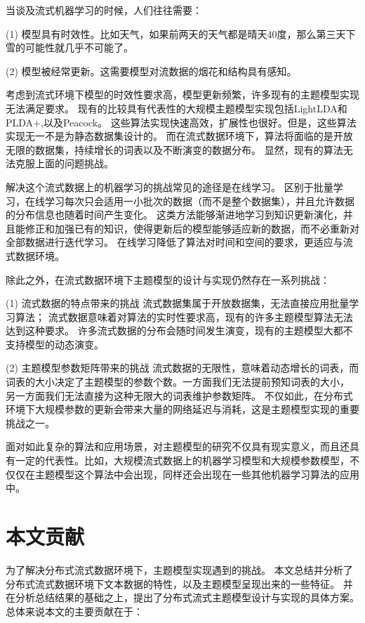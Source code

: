 当谈及流式机器学习的时候，人们往往需要：

(1) 模型具有时效性。比如天气，如果前两天的天气都是晴天40度，那么第三天下雪的可能性就几乎不可能了。

(2) 模型被经常更新。这需要模型对流数据的烟花和结构具有感知。

考虑到流式环境下模型的时效性要求高，模型更新频繁，许多现有的主题模型实现无法满足要求。
现有的比较具有代表性的大规模主题模型实现包括LightLDA\cite{yuan2015lightlda}和PLDA+\cite{Liu:2011:PPL:1961189.1961198},以及Peacock\cite{Peacock}。
这些算法实现快速高效，扩展性也很好。但是，这些算法实现无一不是为静态数据集设计的。
而在流式数据环境下，算法将面临的是开放无限的数据集，持续增长的词表以及不断演变的数据分布。
显然，现有的算法无法克服上面的问题挑战。

解决这个流式数据上的机器学习的挑战常见的途径是在线学习。
区别于批量学习，在线学习每次只会适用一小批次的数据（而不是整个数据集），并且允许数据的分布信息也随着时间产生变化。
这类方法能够渐进地学习到知识更新演化，并且能修正和加强已有的知识，使得更新后的模型能够适应新的数据，而不必重新对全部数据进行迭代学习。
在线学习降低了算法对时间和空间的要求，更适应与流式数据环境。

除此之外，在流式数据环境下主题模型的设计与实现仍然存在一系列挑战：

(1) 流式数据的特点带来的挑战
流式数据集属于开放数据集，无法直接应用批量学习算法；
流式数据意味着对算法的实时性要求高，现有的许多主题模型算法无法达到这种要求。
许多流式数据的分布会随时间发生演变，现有的主题模型大都不支持模型的动态演变。

(2) 主题模型参数矩阵带来的挑战
流式数据的无限性，意味着动态增长的词表，而词表的大小决定了主题模型的参数个数。一方面我们无法提前预知词表的大小，
另一方面我们无法直接为这种无限大的词表维护参数矩阵。
不仅如此，在分布式环境下大规模参数的更新会带来大量的网络延迟与消耗，这是主题模型实现的重要挑战之一。

面对如此复杂的算法和应用场景，对主题模型的研究不仅具有现实意义，而且还具有一定的代表性。比如，大规模流式数据上的机器学习模型和大规模参数模型，不仅仅在主题模型这个算法中会出现，同样还会出现在一些其他机器学习算法的应用中。

\section{本文贡献}

为了解决分布式流式数据环境下，主题模型实现遇到的挑战。
本文总结并分析了分布式流式数据环境下文本数据的特性，以及主题模型呈现出来的一些特征。
并在分析总结结果的基础之上，提出了分布式流式主题模型设计与实现的具体方案。
总体来说本文的主要贡献在于：

